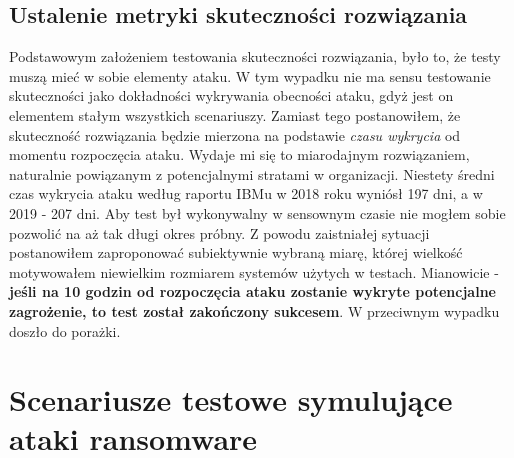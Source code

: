 \subsection{Ustalenie metryki skuteczności rozwiązania}
Podstawowym założeniem testowania skuteczności rozwiązania, było to, że testy muszą mieć w sobie elementy ataku. W tym wypadku nie ma sensu testowanie skuteczności jako dokładności wykrywania obecności ataku, gdyż jest on elementem stałym wszystkich scenariuszy. Zamiast tego postanowiłem, że skuteczność rozwiązania będzie mierzona na podstawie \emph{czasu wykrycia} od momentu rozpoczęcia ataku. Wydaje mi się to miarodajnym rozwiązaniem, naturalnie powiązanym z potencjalnymi stratami w organizacji.
\newline
Niestety średni czas wykrycia ataku według raportu IBMu w 2018 roku wyniósł 197 dni, a w 2019 - 207 dni. Aby test był wykonywalny w sensownym czasie nie mogłem sobie pozwolić na aż tak długi okres próbny. Z powodu zaistniałej sytuacji postanowiłem zaproponować subiektywnie wybraną miarę, której wielkość motywowałem niewielkim rozmiarem systemów użytych w testach. Mianowicie - \textbf{jeśli na 10 godzin od rozpoczęcia ataku zostanie wykryte potencjalne zagrożenie, to test został zakończony sukcesem}. W przeciwnym wypadku doszło do porażki. 
\section{Scenariusze testowe symulujące ataki ransomware}

